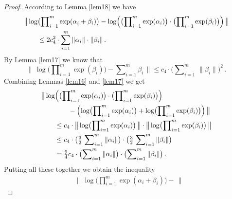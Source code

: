 \documentclass[10pt, a4paper]{amsart}
\theoremstyle{definition}
\numberwithin{equation}{section}
\newcommand{\opn}{\operatorname}
\newcommand{\smfrac}[2]{{\textstyle \frac{#1}{#2}}}
\newcommand{\norm}[1]{\lVert #1 \rVert}
\newcommand{\Norm}[1]{\bigl\lVert\, #1 \, \bigr\rVert}
\begin{document}
\begin{proof}
According to Lemma \ref{lem18} we have
\begin{equation} \label{eqn:97}
\begin{aligned}
& \Norm{ \opn{log} \bigl( \prod\nolimits_{i=1}^m
\opn{exp}(\alpha_i + \beta_i) \bigr) -
\opn{log} \Bigl( \bigl( \prod\nolimits_{i=1}^m \opn{exp}(\alpha_i)
\bigr)
\cdot \bigl( \prod\nolimits_{i=1}^m \opn{exp}(\beta_i) \bigr) \Bigr) }
\\
& \qquad
\leq 2 c_4^2 \cdot 
\sum_{i = 1}^m\, \norm{\alpha_i} \cdot \norm{\beta_i} \, . 
\end{aligned}
\end{equation}
By Lemma \ref{lem17} we know that 
\begin{equation} \label{eqn:98}
\Norm{ \opn{log} \bigl( \prod\nolimits_{i=1}^m
\opn{exp}(\beta_i) \bigr) - \sum\nolimits_{i=1}^m \beta_i } \leq
c_4 \cdot \bigl( \sum\nolimits_{i = 1}^m\, \norm{\beta_i} \bigr)^2 \, .
\end{equation}
Combining Lemmas \ref{lem16} and \ref{lem17} we get
\begin{equation} \label{eqn:99}
\begin{aligned}
& \Norm{ 
\opn{log} \Bigl( \bigl( \prod\nolimits_{i=1}^m \opn{exp}(\alpha_i)
\bigr)
\cdot \bigl( \prod\nolimits_{i=1}^m \opn{exp}(\beta_i) \bigr) \Bigr) \\
& \qquad \qquad  -
\Bigl( \opn{log} \bigl( \prod\nolimits_{i=1}^m \opn{exp}(\alpha_i) \bigr) +
\opn{log} \bigl( \prod\nolimits_{i=1}^m \opn{exp}(\beta_i) \bigr)
\Bigr) } \\
& \qquad \leq c_4 \cdot 
\Norm{ \opn{log} \bigl( \prod\nolimits_{i=1}^m \opn{exp}(\alpha_i) \bigr) }
\cdot 
\Norm{ \opn{log} \bigl( \prod\nolimits_{i=1}^m \opn{exp}(\beta_i) \bigr) } \\
& \qquad \leq c_4 \cdot 
\bigl( \smfrac{3}{2} \, \sum\nolimits_{i = 1}^m\, \norm{\alpha_i} \bigr)
\cdot 
\bigl( \smfrac{3}{2} \, \sum\nolimits_{i = 1}^m\, \norm{\beta_i} \bigr) \\
& \qquad = \smfrac{9}{4} c_4 \cdot 
\bigl( \sum\nolimits_{i = 1}^m\, \norm{\alpha_i} \bigr)
\cdot 
\bigl( \sum\nolimits_{i = 1}^m\, \norm{\beta_i} \bigr) \, . 
\end{aligned}
\end{equation}
Putting all these together we obtain the inequality
\begin{equation} \label{eqn:100}
\begin{aligned}
& \Norm{ \opn{log} 
\bigl( \prod\nolimits_{i=1}^m \opn{exp}(\alpha_i + \beta_i) \bigr) -
}
\end{aligned}
\end{equation}
\end{proof}
\end{document}
